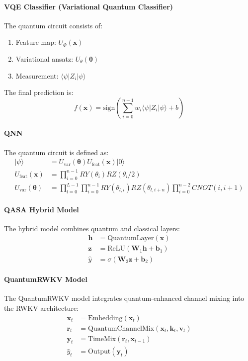 \documentclass[12pt,a4paper]{article}
\begin{document}
\paragraph{VQE Classifier (Variational Quantum Classifier)}
The quantum circuit consists of:
\begin{enumerate}
    \item Feature map: $U_{\Phi}(\mathbf{x})$
    \item Variational ansatz: $U_{\theta}(\boldsymbol{\theta})$
    \item Measurement: $\langle \psi | Z_i | \psi \rangle$
\end{enumerate}

The final prediction is:
\begin{equation}
f(\mathbf{x}) = \text{sign}\left(\sum_{i=0}^{n-1} w_i \langle \psi | Z_i | \psi \rangle + b\right)
\end{equation}

\paragraph{QNN}
The quantum circuit is defined as:
\begin{align}
|\psi\rangle &= U_{\text{var}}(\boldsymbol{\theta}) U_{\text{feat}}(\mathbf{x}) |0\rangle \\
U_{\text{feat}}(\mathbf{x}) &= \prod_{i=0}^{n-1} RY(\theta_i) RZ(\theta_i/2) \\
U_{\text{var}}(\boldsymbol{\theta}) &= \prod_{l=0}^{L-1} \prod_{i=0}^{n-1} RY(\theta_{l,i}) RZ(\theta_{l,i+n}) \prod_{i=0}^{n-2} CNOT(i,i+1)
\end{align}

\paragraph{QASA Hybrid Model}
The hybrid model combines quantum and classical layers:
\begin{align}
\mathbf{h} &= \text{QuantumLayer}(\mathbf{x}) \\
\mathbf{z} &= \text{ReLU}(\mathbf{W}_1 \mathbf{h} + \mathbf{b}_1) \\
\hat{y} &= \sigma(\mathbf{W}_2 \mathbf{z} + \mathbf{b}_2)
\end{align}

\paragraph{QuantumRWKV Model}
The QuantumRWKV model integrates quantum-enhanced channel mixing into the RWKV architecture:
\begin{align}
\mathbf{x}_t &= \text{Embedding}(\mathbf{x}_t) \\
\mathbf{r}_t &= \text{QuantumChannelMix}(\mathbf{x}_t, \mathbf{k}_t, \mathbf{v}_t) \\
\mathbf{y}_t &= \text{TimeMix}(\mathbf{r}_t, \mathbf{x}_{t-1}) \\
\hat{y}_t &= \text{Output}(\mathbf{y}_t)
\end{align}
\end{document}
